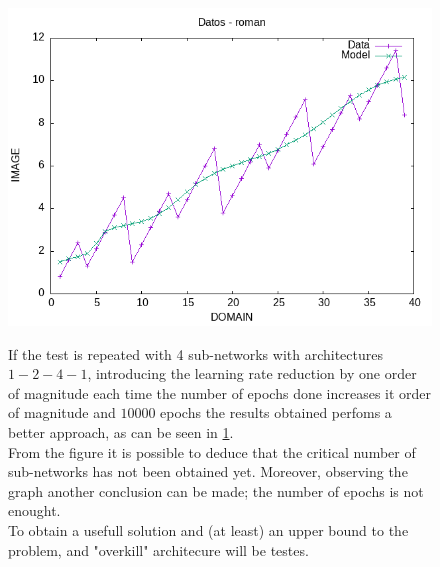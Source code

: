 \documentclass[a4paper, 11pt]{article}
\begin{document}
\begin{figure}[h]
    \begin{minipage}{5.5cm}
        \begin{center}
            \includegraphics[width = 1 \linewidth]{img/roman/roman_third_approach.png}
            \caption{}
            \label{second-approach}
        \end{center}
    \end{minipage} \hspace{1em}
    \begin{minipage}{9cm}
        If the test is repeated with 4 sub-networks with architectures $1-2-4-1$, introducing the learning rate reduction by one order of magnitude each time the number of epochs done increases it order of magnitude and $10000$ epochs the results obtained perfoms a better approach, as can be seen in \ref{second-approach}.\\
        From the figure it is possible to deduce that the critical number of sub-networks has not been obtained yet. Moreover, observing the graph another conclusion can be made; the number of epochs is not enought.\\
        To obtain a usefull solution and (at least) an upper bound to the problem, and "overkill" architecure will be testes. 
    \end{minipage}
\end{figure}
\end{document}
